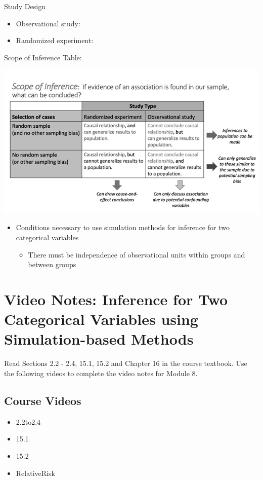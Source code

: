 \documentclass[
]{report}
\providecommand{\tightlist}{%
  \setlength{\itemsep}{0pt}\setlength{\parskip}{0pt}}
\begin{document}
Study Design

\begin{itemize}
\item
  Observational study:
\item
  Randomized experiment:
\end{itemize}

Scope of Inference Table:

\begin{center}\includegraphics[width=0.65\linewidth]{images/ScopeOfInferenceGreyscale} \end{center}

\begin{itemize}
\item
  Conditions necessary to use simulation methods for inference for two categorical variables

  \begin{itemize}
  \tightlist
  \item
    There must be independence of observational units within groups and between groups
  \end{itemize}
\end{itemize}

\newpage

\section{Video Notes: Inference for Two Categorical Variables using Simulation-based Methods}\label{video-notes-inference-for-two-categorical-variables-using-simulation-based-methods}

Read Sections 2.2 - 2.4, 15.1, 15.2 and Chapter 16 in the course textbook. Use the following videos to complete the video notes for Module 8.

\subsection{Course Videos}\label{course-videos-2}

\begin{itemize}
\item
  2.2to2.4
\item
  15.1
\item
  15.2
\item
  RelativeRisk
\end{itemize}
\end{document}
